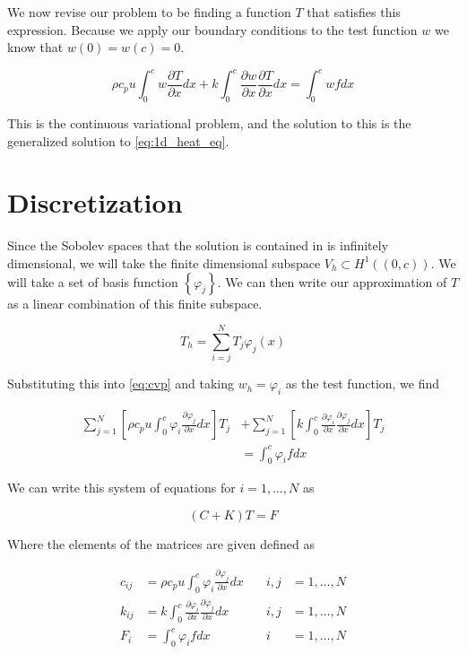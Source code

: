 \documentclass[10pt]{amsart}
\numberwithin{equation}{section}
\theoremstyle{definition}
\newcommand{\pder}[2][]{\frac{\partial#1}{\partial#2}}
\begin{document}
\begin{multicols}{2}
  We now revise our problem to be finding a function $T$ that satisfies this
  expression. Because we apply our boundary conditions to the test function $w$
  we know that $w(0)=w(c)=0$.

  \begin{equation}\label{eq:cvp}
    \rho c_p
    u\int_0^cw\pder[T]{x}dx+k\int_0^c\pder[w]{x}\pder[T]{x}dx=\int_0^cwfdx
  \end{equation}


  This is the continuous variational problem, and the solution to this is the
  generalized solution to \eqref{eq:1d_heat_eq}.

  \section{Discretization}%
  \label{sec:discretization}

  Since the Sobolev spaces that the solution is contained in is infinitely
  dimensional, we will take the finite dimensional subspace $V_h\subset
  H^1((0,c))$. We will take a set of basis function $\left\{\varphi_j\right\}$.
  We can then write our approximation of $T$ as a linear combination of this
  finite subspace.

  \begin{equation}\label{eq:th}
    T_h=\sum_{i=j}^{N}T_j\varphi_j(x)
  \end{equation}

  Substituting this into \eqref{eq:cvp} and taking $w_h=\varphi_i$ as the test
  function, we find

  \begin{align*}
    \sum_{j=1}^{N}\left[\rho c_pu \int_0^c\varphi_i\pder[\varphi_j]{x}dx\right]T_j
  &+ \sum_{j=1}^{N}\left[k\int_0^c\pder[\varphi_i]{x}\pder[\varphi_j]{x}dx\right]T_j\\
  &=\int_0^c\varphi_ifdx
  \end{align*}

  We can write this system of equations for $i=1,\ldots,N$ as

  \begin{equation}\label{eq:matrix}
    (C+K)T=F
  \end{equation}

  Where the elements of the matrices are given defined as

  \begin{align*}
    c_{ij}&=\rho c_p u\int_0^c\varphi_i\pder[\varphi_j]{x}dx\quad &i,j&=1,\ldots,N\\
    k_{ij}&=k\int_0^c\pder[\varphi_i]{x}\pder[\varphi_j]{x}dx\quad &i,j&=1,\ldots,N\\
    F_i&=\int_0^c\varphi_ifdx &i&=1,\ldots,N
  \end{align*}


\end{multicols}
\end{document}
